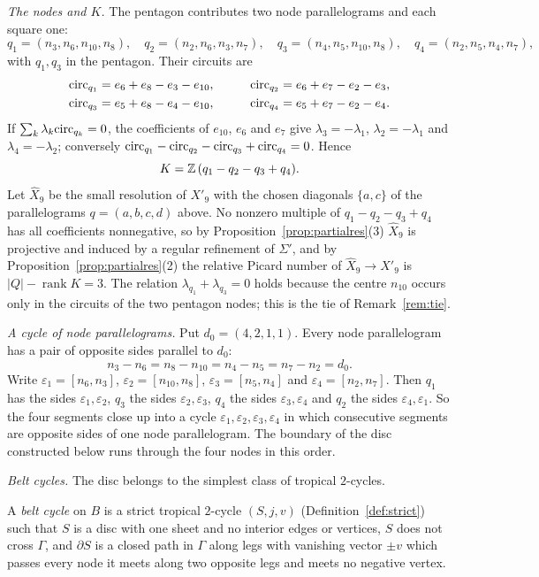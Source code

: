 \emph{The nodes and $K$.} The pentagon contributes two node parallelograms and each square one:
\[
q_1=(n_3,n_6,n_{10},n_8),\quad q_2=(n_2,n_6,n_3,n_7),\quad q_3=(n_4,n_5,n_{10},n_8),\quad q_4=(n_2,n_5,n_4,n_7),
\]
with $q_1,q_3$ in the pentagon. Their circuits are
\[
\begin{aligned}
\mathrm{circ}_{q_1}&=e_6+e_8-e_3-e_{10}, &\qquad \mathrm{circ}_{q_2}&=e_6+e_7-e_2-e_3,\\
\mathrm{circ}_{q_3}&=e_5+e_8-e_4-e_{10}, & \mathrm{circ}_{q_4}&=e_5+e_7-e_2-e_4.
\end{aligned}
\]
If $\sum_k\lambda_k\mathrm{circ}_{q_k}=0$, the coefficients of $e_{10}$, $e_6$ and $e_7$ give $\lambda_3=-\lambda_1$,
$\lambda_2=-\lambda_1$ and $\lambda_4=-\lambda_2$; conversely $\mathrm{circ}_{q_1}-\mathrm{circ}_{q_2}-\mathrm{circ}_{q_3}+\mathrm{circ}_{q_4}=0$. Hence
\[
K=\mathbb Z\,(q_1-q_2-q_3+q_4).
\]
Let $\widehat X_9$ be the small resolution of $X'_9$ with the chosen diagonals $\{a,c\}$ of the parallelograms
$q=(a,b,c,d)$ above. No nonzero multiple of $q_1-q_2-q_3+q_4$ has all coefficients nonnegative, so by
Proposition~\ref{prop:partialres}(3) $\widehat X_9$ is projective and induced by a regular refinement of $\Sigma'$, and by
Proposition~\ref{prop:partialres}(2) the relative Picard number of $\widehat X_9\to X'_9$ is $|Q|-\operatorname{rank}K=3$. The relation
$\lambda_{q_1}+\lambda_{q_3}=0$ holds because the centre $n_{10}$ occurs only in the circuits of the two pentagon nodes;
this is the tie of Remark~\ref{rem:tie}.

\emph{A cycle of node parallelograms.} Put $d_0=(4,2,1,1)$. Every node parallelogram has a pair of opposite sides
parallel to $d_0$:
\[
n_3-n_6=n_8-n_{10}=n_4-n_5=n_7-n_2=d_0 .
\]
Write $\varepsilon_1=[n_6,n_3]$, $\varepsilon_2=[n_{10},n_8]$, $\varepsilon_3=[n_5,n_4]$ and $\varepsilon_4=[n_2,n_7]$. Then $q_1$ has the sides
$\varepsilon_1,\varepsilon_2$, $q_3$ the sides $\varepsilon_2,\varepsilon_3$, $q_4$ the sides $\varepsilon_3,\varepsilon_4$ and $q_2$ the sides
$\varepsilon_4,\varepsilon_1$. So the four segments close up into a cycle $\varepsilon_1,\varepsilon_2,\varepsilon_3,\varepsilon_4$ in which consecutive
segments are opposite sides of one node parallelogram. The boundary of the disc constructed below runs through the
four nodes in this order.

\emph{Belt cycles.} The disc belongs to the simplest class of tropical $2$-cycles.

\begin{definition}\label{def:belt}
A \emph{belt cycle} on $B$ is a strict tropical $2$-cycle $(S,j,v)$ (Definition~\ref{def:strict}) such that $S$ is a disc
with one sheet and no interior edges or vertices, $S$ does not cross $\Gamma$, and $\partial S$ is a closed path in
$\Gamma$ along legs with vanishing vector $\pm v$ which passes every node it meets along two opposite legs and meets no
negative vertex.
\end{definition}

